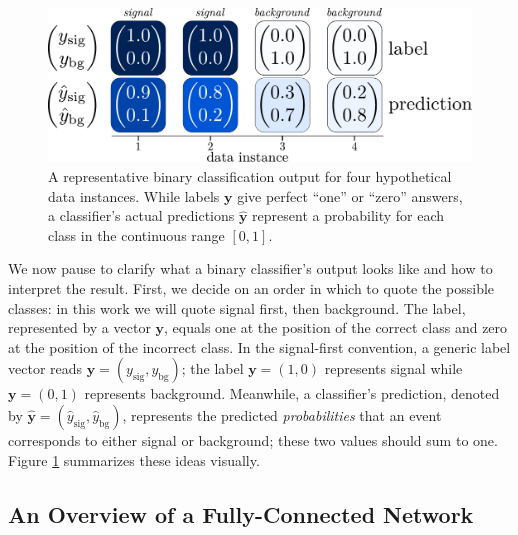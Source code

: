 \documentclass[11pt, a4paper]{article}
\renewcommand{\vec}[1]{\bm{#1}}
\newcommand{\y}{\vec{y}}
\begin{document}
\begin{figure}[htb!]
    \centering
    \includegraphics[width=0.85\linewidth]{vector/binary-output.pdf}
    \caption{A representative binary classification output for four hypothetical data instances.
    While labels $ \y $ give perfect ``one'' or ``zero'' answers, a classifier's actual predictions $ \hat{\y} $ represent a probability for each class in the continuous range $ [0, 1] $.}
    \label{fig:output}
\end{figure}

We now pause to clarify what a binary classifier's output looks like and how to interpret the result.
First, we decide on an order in which to quote the possible classes: in this work we will quote signal first, then background.
The label, represented by a vector $ \vec{y} $, equals one at the position of the correct class and zero at the position of the incorrect class.
In the signal-first convention, a generic label vector reads $ \vec{y} = (y_{\text{sig}}, y_{\text{bg}}) $; the label $ \vec{y} = (1, 0) $ represents signal while $ \vec{y} = (0, 1) $ represents background.
Meanwhile, a classifier's prediction, denoted by $ \hat{\y} = (\hat{y}_{\text{sig}}, \hat{y}_{\text{bg}})$, represents the predicted \textit{probabilities} that an event corresponds to either signal or background; these two values should sum to one.
Figure \ref{fig:output} summarizes these ideas visually.


\subsection{An Overview of a Fully-Connected Network} \label{ss:fcn-first-look}
\end{document}
